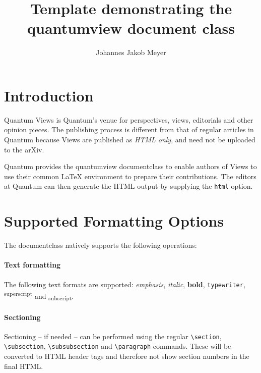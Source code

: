 \documentclass{quantumview}
\begin{document}
\title{Template demonstrating the quantumview document class}

\author{Johannes Jakob Meyer}

\maketitle

\section{Introduction}
Quantum Views is Quantum's venue for perspectives, views, editorials and other opinion pieces. The publishing process is different from that of regular articles in Quantum because Views are published as \emph{HTML only}, and need not be uploaded to the arXiv.

Quantum provides the quantumview documentclass to enable authors of Views to use their common LaTeX environment to prepare their contributions. The editors at Quantum can then generate the HTML output by supplying the \texttt{html} option.

\section{Supported Formatting Options}
The documentclass natively supports the following operations:

\paragraph{Text formatting} The following text formats are supported:
\emph{emphasis}, \textit{italic}, \textbf{bold}, \texttt{typewriter}, \textsuperscript{superscript} and \textsubscript{subscript}.

\paragraph{Sectioning} Sectioning -- if needed -- can be performed using the regular \texttt{{\textbackslash}section}, \texttt{{\textbackslash}subsection}, \texttt{{\textbackslash}subsubsection} and \texttt{{\textbackslash}paragraph} commands. These will be converted to HTML header tags and therefore not show section numbers in the final HTML.
\end{document}

